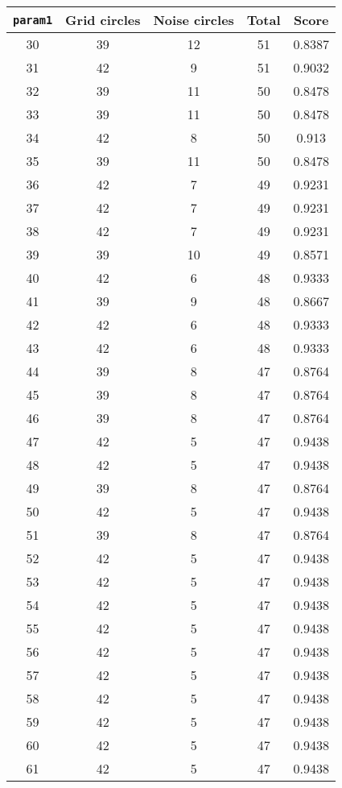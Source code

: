 \documentclass[letterpaper, 12pt]{article}
\begin{document}
\begin{longtable}{|c|c|c|c|c|}
\hline
\textbf{\texttt{param1}} & \textbf{Grid circles} & \textbf{Noise circles} & \textbf{Total} & \textbf{Score} \\
\hline
30 & 39 & 12 & 51 & 0.8387 \\
\hline
31 & 42 & 9 & 51 & 0.9032 \\
\hline
32 & 39 & 11 & 50 & 0.8478 \\
\hline
33 & 39 & 11 & 50 & 0.8478 \\
\hline
34 & 42 & 8 & 50 & 0.913 \\
\hline
35 & 39 & 11 & 50 & 0.8478 \\
\hline
36 & 42 & 7 & 49 & 0.9231 \\
\hline
37 & 42 & 7 & 49 & 0.9231 \\
\hline
38 & 42 & 7 & 49 & 0.9231 \\
\hline
39 & 39 & 10 & 49 & 0.8571 \\
\hline
40 & 42 & 6 & 48 & 0.9333 \\
\hline
41 & 39 & 9 & 48 & 0.8667 \\
\hline
42 & 42 & 6 & 48 & 0.9333 \\
\hline
43 & 42 & 6 & 48 & 0.9333 \\
\hline
44 & 39 & 8 & 47 & 0.8764 \\
\hline
45 & 39 & 8 & 47 & 0.8764 \\
\hline
46 & 39 & 8 & 47 & 0.8764 \\
\hline
47 & 42 & 5 & 47 & 0.9438 \\
\hline
48 & 42 & 5 & 47 & 0.9438 \\
\hline
49 & 39 & 8 & 47 & 0.8764 \\
\hline
50 & 42 & 5 & 47 & 0.9438 \\
\hline
51 & 39 & 8 & 47 & 0.8764 \\
\hline
52 & 42 & 5 & 47 & 0.9438 \\
\hline
53 & 42 & 5 & 47 & 0.9438 \\
\hline
54 & 42 & 5 & 47 & 0.9438 \\
\hline
55 & 42 & 5 & 47 & 0.9438 \\
\hline
56 & 42 & 5 & 47 & 0.9438 \\
\hline
57 & 42 & 5 & 47 & 0.9438 \\
\hline
58 & 42 & 5 & 47 & 0.9438 \\
\hline
59 & 42 & 5 & 47 & 0.9438 \\
\hline
60 & 42 & 5 & 47 & 0.9438 \\
\hline
61 & 42 & 5 & 47 & 0.9438 \\

\end{longtable}
\end{document}
